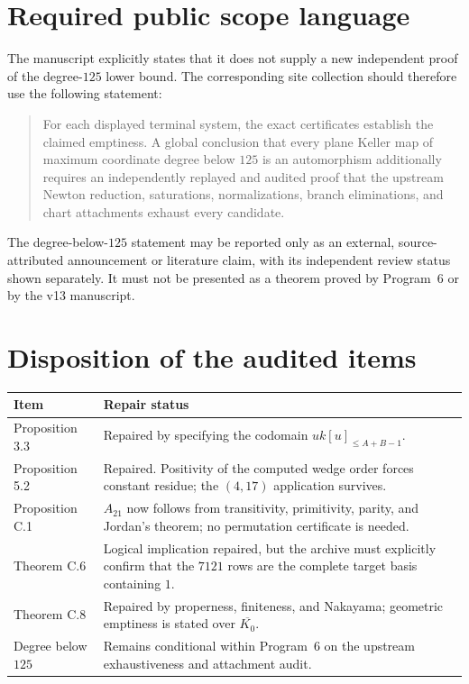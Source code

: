 \documentclass[11pt]{article}
\begin{document}
\section{Required public scope language}

The manuscript explicitly states that it does not supply a new independent
proof of the degree-$125$ lower bound.  The corresponding site collection
should therefore use the following statement:

\begin{quote}
For each displayed terminal system, the exact certificates establish the
claimed emptiness.  A global conclusion that every plane Keller map of
maximum coordinate degree below $125$ is an automorphism additionally
requires an independently replayed and audited proof that the upstream
Newton reduction, saturations, normalizations, branch eliminations, and
chart attachments exhaust every candidate.
\end{quote}

\noindent
The degree-below-$125$ statement may be reported only as an external,
source-attributed announcement or literature claim, with its independent
review status shown separately.  It must not be presented as a theorem proved
by Program~6 or by the v13 manuscript.

\section{Disposition of the audited items}

\begin{center}
\begin{tabular}{@{}p{}p{}@{}}
\toprule
Item & Repair status \\
\midrule
Proposition 3.3 & Repaired by specifying the codomain
$u k[u]_{\le A+B-1}$. \\
Proposition 5.2 & Repaired.  Positivity of the computed wedge order forces
constant residue; the $(4,17)$ application survives. \\
Proposition C.1 & $A_{21}$ now follows from transitivity, primitivity,
parity, and Jordan's theorem; no permutation certificate is needed. \\
Theorem C.6 & Logical implication repaired, but the archive must explicitly
confirm that the $7121$ rows are the complete target basis containing $1$. \\
Theorem C.8 & Repaired by properness, finiteness, and Nakayama; geometric
emptiness is stated over $\overline{K_0}$. \\
Degree below $125$ & Remains conditional within Program~6 on the upstream
exhaustiveness and attachment audit. \\
\bottomrule
\end{tabular}
\end{center}
\end{document}
